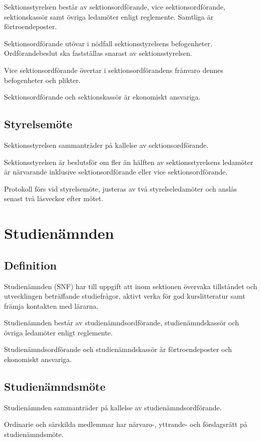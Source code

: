 \documentclass{styrdokument}
\begin{document}
\? Sektionsstyrelsen består av sektionsordförande, vice sektionsordförande, sektionskassör samt övriga ledamöter enligt reglemente.
Samtliga är förtroendeposter.

\? Sektionsordförande utövar i nödfall sektionsstyrelsens befogenheter.
Ordförandebeslut ska fastställas snarast av sektionsstyrelsen.

\? Vice sektionsordförande övertar i sektionsordförandens frånvaro dennes befogenheter och plikter.

\? Sektionsordförande och sektionskassör är ekonomiskt ansvariga.

\subsection{Styrelsemöte}

\? Sektionsstyrelsen sammanträder på kallelse av sektionsordförande.

\? Sektionsstyrelsen är beslutsför om fler än hälften av sektionsstyrelsens ledamöter är närvarande inklusive sektionsordförande eller vice sektionsordförande.

\? Protokoll förs vid styrelsemöte, justeras av två styrelseledamöter och anslås senast två läsveckor efter mötet.

\section{Studienämnden}
\subsection{Definition}

\? Studienämnden (SNF) har till uppgift att inom sektionen övervaka tillståndet och utvecklingen beträffande studiefrågor, aktivt verka för god kurslitteratur samt främja kontakten med lärarna.

\? Studienämnden består av studienämndsordförande, studienämndskassör och övriga ledamöter enligt reglemente.

\? Studienämndsordförande och studienämndskassör är förtroendeposter och ekonomiskt ansvariga.

\subsection{Studienämndsmöte}

\? Studienämnden sammanträder på kallelse av studienämndsordförande.

\? Ordinarie och särskilda medlemmar har närvaro-, yttrande- och förslagsrätt på studienämndsmöte.
\label{ratt.snf}
\end{document}
